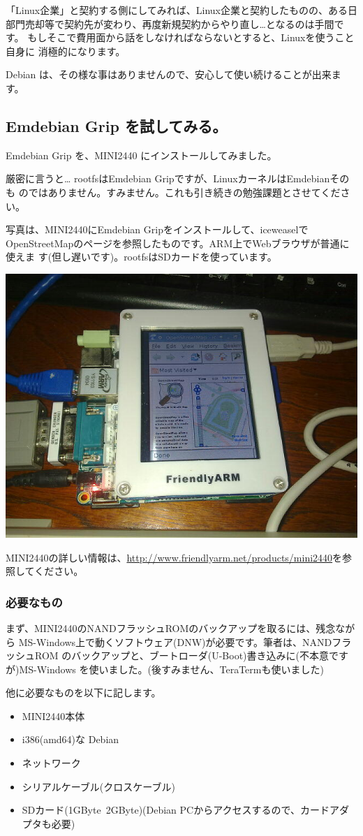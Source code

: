 \documentclass[mingoth,a4paper]{jsarticle}
\begin{document}
「Linux企業」と契約する側にしてみれば、Linux企業と契約したものの、ある日
部門売却等で契約先が変わり、再度新規契約からやり直し…となるのは手間です。
もしそこで費用面から話をしなければならないとすると、Linuxを使うこと自身に
消極的になります。

Debian は、その様な事はありませんので、安心して使い続けることが出来ます。

\subsection{Emdebian Grip を試してみる。}

Emdebian Grip を、MINI2440 にインストールしてみました。

厳密に言うと… rootfsはEmdebian Gripですが、LinuxカーネルはEmdebianそのも
のではありません。すみません。これも引き続きの勉強課題とさせてください。

写真は、MINI2440にEmdebian Gripをインストールして、iceweaselで
OpenStreetMapのページを参照したものです。ARM上でWebブラウザが普通に使えま
す(但し遅いです)。rootfsはSDカードを使っています。

\begin{center}
 \includegraphics[width=0.5\hsize]{image201008/emdebian.jpg}
\end{center}

MINI2440の詳しい情報は、\url{http://www.friendlyarm.net/products/mini2440}を参照してください。

\subsubsection{必要なもの}

まず、MINI2440のNANDフラッシュROMのバックアップを取るには、残念ながら
MS-Windows上で動くソフトウェア(DNW)が必要です。筆者は、NANDフラッシュROM
のバックアップと、ブートローダ(U-Boot)書き込みに(不本意ですが)MS-Windows
を使いました。(後すみません、TeraTermも使いました)

他に必要なものを以下に記します。
\begin{itemize}
 \item MINI2440本体
 \item i386(amd64)な Debian
 \item ネットワーク
 \item シリアルケーブル(クロスケーブル)
 \item SDカード(1GByte~2GByte)(Debian PCからアクセスするので、カードアダプタも必要)
\end{itemize}
\end{document}
